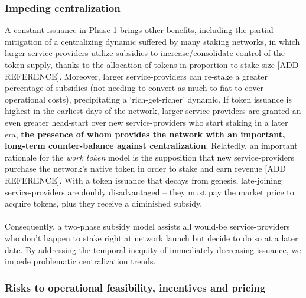 \documentclass[longbibliography,nofootinbib]{revtex4-1}
\begin{document}
\subsubsection{Impeding centralization}

A constant issuance in Phase 1 brings other benefits, including the partial mitigation of a centralizing dynamic suffered by many staking networks, in which larger service-providers utilize subsidies to increase/consolidate control of the token supply, thanks to the allocation of tokens in proportion to stake size [ADD REFERENCE]. Moreover, larger service-providers can re-stake a greater percentage of subsidies (not needing to convert as much to fiat to cover operational costs), precipitating a `rich-get-richer' dynamic. If token issuance is highest in the earliest days of the network, larger service-providers are granted an even greater head-start over new service-providers who start staking in a later era, \textbf{the presence of whom provides the network with an important, long-term counter-balance against centralization}. Relatedly, an important rationale for the \textit{work token} model is the supposition that new service-providers purchase the network's native token in order to stake and earn revenue [ADD REFERENCE]. With a token issuance that decays from genesis, late-joining service-providers are doubly disadvantaged – they must pay the market price to acquire tokens, plus they receive a diminished subsidy. 
\\\\
Consequently, a two-phase subsidy model assists all would-be service-providers who don't happen to stake right at network launch but decide to do so at a later date. By addressing the temporal inequity of immediately decreasing issuance, we impede problematic centralization trends.

\subsubsection{Risks to operational feasibility, incentives and pricing}
\end{document}
